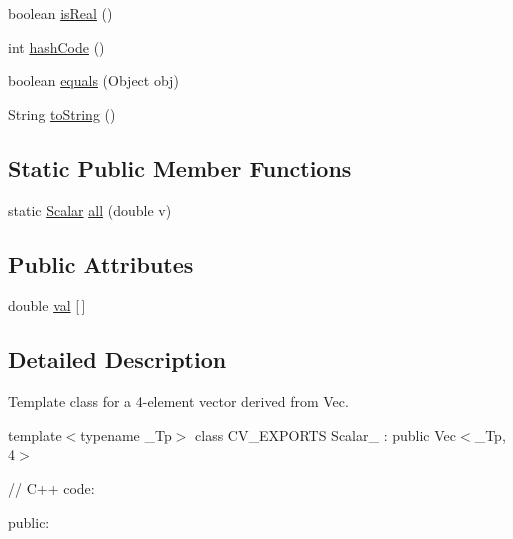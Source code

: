 \begin{DoxyCompactItemize}
\item 
boolean \mbox{\hyperlink{classorg_1_1opencv_1_1core_1_1_scalar_adb5fa226bef53c802266aa92dd990eb9}{is\+Real}} ()
\item 
int \mbox{\hyperlink{classorg_1_1opencv_1_1core_1_1_scalar_af8ce69511ac02979ea924ee58faa566c}{hash\+Code}} ()
\item 
boolean \mbox{\hyperlink{classorg_1_1opencv_1_1core_1_1_scalar_aa31070a4b7d142d715dc0d2a98a97d30}{equals}} (Object obj)
\item 
String \mbox{\hyperlink{classorg_1_1opencv_1_1core_1_1_scalar_a356103a63673efc5aa249ee1d9746b27}{to\+String}} ()
\end{DoxyCompactItemize}
\subsection*{Static Public Member Functions}
\begin{DoxyCompactItemize}
\item 
static \mbox{\hyperlink{classorg_1_1opencv_1_1core_1_1_scalar}{Scalar}} \mbox{\hyperlink{classorg_1_1opencv_1_1core_1_1_scalar_a23961589549dcb0c16f97418e26464e7}{all}} (double v)
\end{DoxyCompactItemize}
\subsection*{Public Attributes}
\begin{DoxyCompactItemize}
\item 
double \mbox{\hyperlink{classorg_1_1opencv_1_1core_1_1_scalar_ad5d5ede832d661889ead64c3353f9dd5}{val}} \mbox{[}$\,$\mbox{]}
\end{DoxyCompactItemize}


\subsection{Detailed Description}
Template class for a 4-\/element vector derived from Vec.

template$<$typename \+\_\+\+Tp$>$ class C\+V\+\_\+\+E\+X\+P\+O\+R\+TS Scalar\+\_\+ \+: public Vec$<$\+\_\+\+Tp, 4$>$ {\ttfamily }

{\ttfamily }

{\ttfamily }

{\ttfamily // C++ code\+:}

{\ttfamily }

{\ttfamily }

{\ttfamily public\+:}

